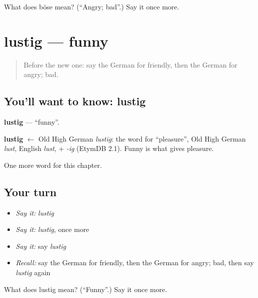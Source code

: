 \begin{tcolorbox}[breakable,colback=teal!4,colframe=teal!35!black,title={Before you move on}]
What does böse mean? (\textquotedblleft{}Angry; bad\textquotedblright{}.) Say it once more.
\end{tcolorbox}
\section[lustig]{lustig — funny}

\label{lesson:GE-C133-lustig}



\begin{quote}
Before the new one: say the German for friendly, then the German for angry; bad.
\end{quote}

\subsection*{You'll want to know: lustig}
\textbf{lustig} — \textquotedblleft{}funny\textquotedblright{}.

\begin{cousinweb}
\textbf{lustig} $\leftarrow$ Old High German \emph{lustīg}: the word for \textquotedblleft{}pleasure\textquotedblright{}, Old High German \emph{lust}, English \emph{lust}, + \emph{-ig} (EtymDB 2.1). Funny is what gives pleasure.
\end{cousinweb}

\begin{grammarlens}[title={What you've built}]
One more word for this chapter.
\end{grammarlens}

\subsection*{Your turn}
\begin{itemize}
\raggedright
  \item \emph{Say it:} \emph{lustig}
  \item \emph{Say it:} \emph{lustig}, once more
  \item \emph{Say it:} say \emph{lustig}
  \item \emph{Recall:} say the German for friendly, then the German for angry; bad, then say \emph{lustig} again
\end{itemize}

\begin{tcolorbox}[breakable,colback=teal!4,colframe=teal!35!black,title={Before you move on}]
What does lustig mean? (\textquotedblleft{}Funny\textquotedblright{}.) Say it once more.
\end{tcolorbox}

